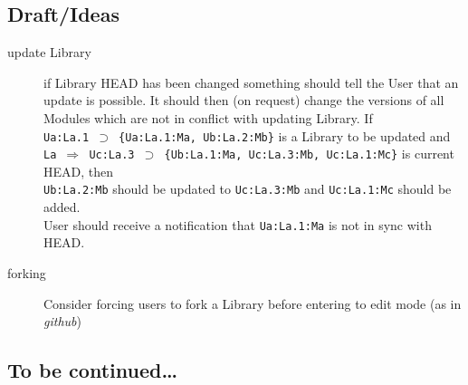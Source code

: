 \documentclass[10pt]{article}
\def\headsto{${\Longrightarrow}$ }
\def\hto{\headsto}
\def\eq{${\supset}$ }
\begin{document}
	\subsection*{Draft/Ideas}
	\begin{description}
		\item[update Library] if Library HEAD has been changed something should tell the User that an update is possible. It should then (on request) change the versions of all Modules which are not in conflict with updating Library. If \\
			{\tt Ua:La.1 \eq \{Ua:La.1:Ma, Ub:La.2:Mb\}} is a Library to be updated and \\
			{\tt La \hto Uc:La.3 \eq \{Ub:La.1:Ma, Uc:La.3:Mb, Uc:La.1:Mc\}} is current HEAD, then\\
			{\tt Ub:La.2:Mb} should be updated to {\tt Uc:La.3:Mb} and {\tt Uc:La.1:Mc} should be added.\\
			User should receive a notification that {\tt Ua:La.1:Ma} is not in sync with HEAD.
		\item[forking] Consider forcing users to fork a Library before entering to edit mode (as in {\em github})
	\end{description}

	\subsection*{To be continued\ldots}
\end{document}
